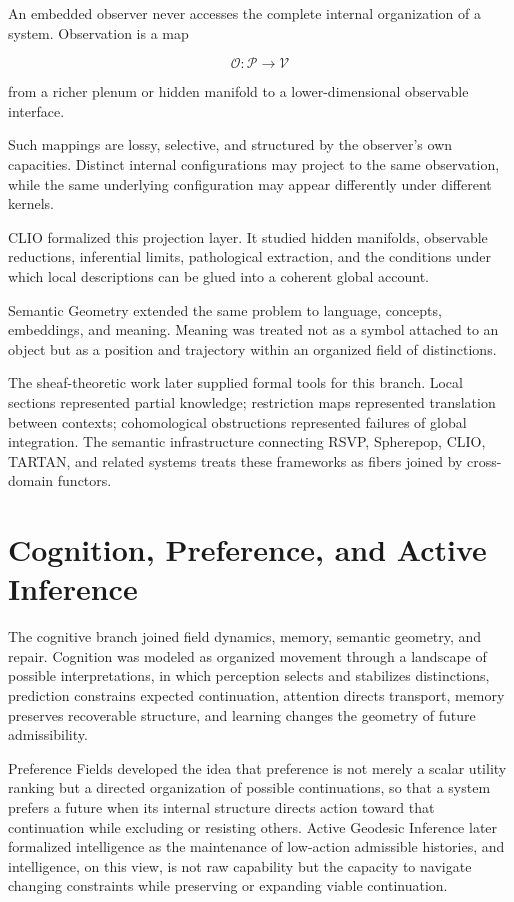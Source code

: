 \documentclass[11pt,oneside]{book}
\numberwithin{equation}{chapter}
\theoremstyle{definition}
\theoremstyle{plain}
\begin{document}
An embedded observer never accesses the complete internal organization of a
system. Observation is a map

\[
\mathcal O:
\mathcal P
\longrightarrow
\mathcal V
\]

from a richer plenum or hidden manifold to a lower-dimensional observable
interface.

Such mappings are lossy, selective, and structured by the observer's own
capacities. Distinct internal configurations may project to the same
observation, while the same underlying configuration may appear differently
under different kernels.

CLIO formalized this projection layer. It studied hidden manifolds,
observable reductions, inferential limits, pathological extraction, and the
conditions under which local descriptions can be glued into a coherent
global account.

Semantic Geometry extended the same problem to language, concepts,
embeddings, and meaning. Meaning was treated not as a symbol attached to an
object but as a position and trajectory within an organized field of
distinctions.

The sheaf-theoretic work later supplied formal tools for this branch. Local
sections represented partial knowledge; restriction maps represented
translation between contexts; cohomological obstructions represented
failures of global integration. The semantic infrastructure connecting
RSVP, Spherepop, CLIO, TARTAN, and related systems treats these frameworks
as fibers joined by cross-domain functors.

\section{Cognition, Preference, and Active Inference}

The cognitive branch joined field dynamics, memory, semantic geometry, and repair. Cognition was modeled as organized movement through a landscape of possible interpretations, in which perception selects and stabilizes distinctions, prediction constrains expected continuation, attention directs transport, memory preserves recoverable structure, and learning changes the geometry of future admissibility.

Preference Fields developed the idea that preference is not merely a scalar utility ranking but a directed organization of possible continuations, so that a system prefers a future when its internal structure directs action toward that continuation while excluding or resisting others. Active Geodesic Inference later formalized intelligence as the maintenance of low-action admissible histories, and intelligence, on this view, is not raw capability but the capacity to navigate changing constraints while preserving or expanding viable continuation.
\end{document}
